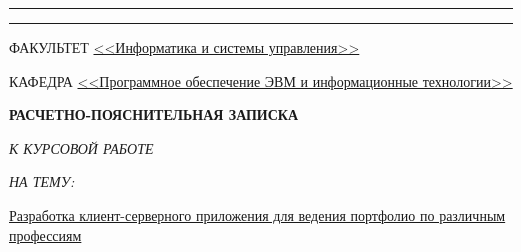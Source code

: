 \begin{titlepage}
    \vspace{-2.4cm}

    \begin{flushleft}
        \rule[-1cm]{\textwidth}{2.5pt}
        \rule{\textwidth}{0.5pt}
    \end{flushleft}

    \begin{flushleft}
        \small
        ФАКУЛЬТЕТ \uline{\hfill<<Информатика и системы управления>>\hfill} \par
        \vspace{0.25cm}
        КАФЕДРА \uline{\hfill<<Программное обеспечение ЭВМ и информационные технологии>>\hfill} \par
    \end{flushleft}

    \vspace{3.5cm}

    {\Large\scshape\bfseries\centering
        РАСЧЕТНО-ПОЯСНИТЕЛЬНАЯ ЗАПИСКА
        \vspace{0.4cm}

        \textit{К КУРСОВОЙ РАБОТЕ}
        \vspace{0.4cm}

        \textit{НА ТЕМУ:}

    }
    \vspace{0.75cm}
        \normalsize

        \noindent
        \uline{\quad{}Разработка клиент-серверного приложения для ведения портфолио по различным профессиям\hfill}

        \noindent
        \uline{\hfill{}\hfill}

        \noindent
        \uline{\hfill{}\hfill}

        \noindent
        \uline{\hfill{}\hfill}

        \noindent
        \uline{\hfill{}\hfill}

    \vspace{1.5cm}

    \centering


\end{titlepage}
